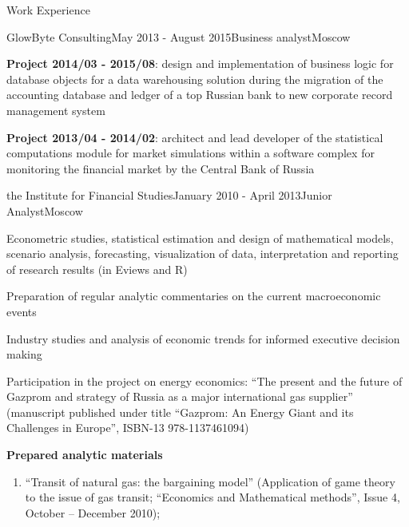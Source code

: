 \documentclass{resume} %
\begin{document}
\bigskip
\begin{rSection}{Work Experience}

\begin{rSubsection}{GlowByte Consulting}{May 2013 - August 2015}{Business analyst}{Moscow}
    \item \textbf{Project 2014/03 - 2015/08}: design and implementation of business logic
    for database objects for a data warehousing solution during the migration of the accounting
    database and ledger of a top Russian bank to new corporate record management system

    \medskip
    \item \textbf{Project 2013/04 - 2014/02}: architect and lead developer of the statistical
    computations module for market simulations within a software complex for monitoring the
    financial market by the Central Bank of Russia
\end{rSubsection}

\bigskip
\begin{rSubsection}{the Institute for Financial Studies}{January 2010 - April 2013}{Junior Analyst}{Moscow}
    \item Econometric studies, statistical estimation and design of mathematical
    models, scenario analysis, forecasting, visualization of data, interpretation and
    reporting of research results (in Eviews and R)

    \item Preparation of regular analytic commentaries on the current macroeconomic
    events

    \item Industry studies and analysis of economic trends for informed executive
    decision making

    \item Participation in the project on energy economics: ``The present and the
    future of Gazprom and strategy of Russia as a major international gas supplier''
    (manuscript published under title ``Gazprom: An Energy Giant and its
    Challenges in Europe'', ISBN-13 978-1137461094)

    \medskip
    \textbf{Prepared analytic materials} \begin{enumerate}
        \item ``Transit of natural gas: the bargaining model'' (Application of game
        theory to the issue of gas transit; ``Economics and Mathematical methods'',
        Issue 4, October – December 2010);
        

\end{enumerate}
\end{rSubsection}
\end{rSection}
\end{document}

